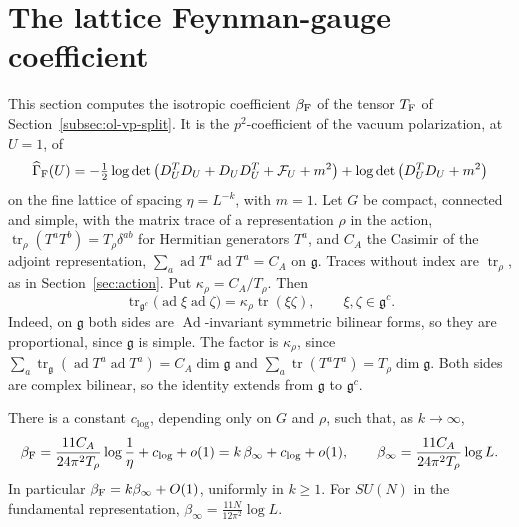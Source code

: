 \section{The lattice Feynman-gauge coefficient}\label{sec:ol-feynman}

This section computes the isotropic coefficient $\beta_{\rm F}$ of the tensor $T_{\rm F}$ of Section~\ref{subsec:ol-vp-split}. It is the $p^2$-coefficient of the vacuum polarization, at $U=1$, of
\[
\widehat\Gamma_{\rm F}(U)=-\tfrac12\log\det\big(D_U^TD_U+D_UD_U^T+\mathcal F_U+m^2\big)+\log\det\big(D_U^TD_U+m^2\big)
\]
on the fine lattice of spacing $\eta=L^{-k}$, with $m=1$. Let $G$ be compact, connected and simple, with the matrix trace of a representation $\rho$ in the action, $\operatorname{tr}_\rho(T^aT^b)=T_\rho\delta^{ab}$ for Hermitian generators $T^a$, and $C_A$ the Casimir of the adjoint representation, $\sum_a\operatorname{ad}T^a\operatorname{ad}T^a=C_A$ on $\mathfrak g$. Traces without index are $\operatorname{tr}_\rho$, as in Section~\ref{sec:action}. Put $\kappa_\rho=C_A/T_\rho$. Then
\begin{equation}\label{eq:ol-kappa}
\operatorname{tr}_{\mathfrak g^c}\big(\operatorname{ad}\xi\operatorname{ad}\zeta\big)=\kappa_\rho\operatorname{tr}(\xi\zeta),\qquad \xi,\zeta\in\mathfrak g^c .
\end{equation}
Indeed, on $\mathfrak g$ both sides are $\operatorname{Ad}$-invariant symmetric bilinear forms, so they are proportional, since $\mathfrak g$ is simple. The factor is $\kappa_\rho$, since $\sum_a\operatorname{tr}_{\mathfrak g}(\operatorname{ad}T^a\operatorname{ad}T^a)=C_A\dim\mathfrak g$ and $\sum_a\operatorname{tr}(T^aT^a)=T_\rho\dim\mathfrak g$. Both sides are complex bilinear, so the identity extends from $\mathfrak g$ to $\mathfrak g^c$.

\begin{theorem}\label{thm:ol-log}
There is a constant $c_{\log}$, depending only on $G$ and $\rho$, such that, as $k\to\infty$,
\[
\beta_{\rm F}=\frac{11C_A}{24\pi^2T_\rho}\log\frac1\eta+c_{\log}+o(1)=k\,\beta_\infty+c_{\log}+o(1),\qquad\beta_\infty=\frac{11C_A}{24\pi^2T_\rho}\log L .
\]
In particular $\beta_{\rm F}=k\beta_\infty+O(1)$, uniformly in $k\ge1$. For $SU(N)$ in the fundamental representation, $\beta_\infty=\frac{11N}{12\pi^2}\log L$.
\end{theorem}

